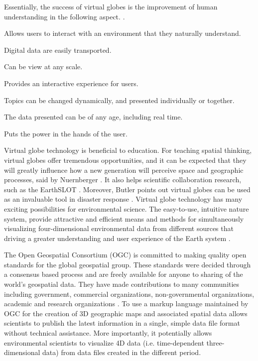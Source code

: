Essentially, the success of virtual globes is the improvement of human understanding in the following aspect. \cite{tuttle.virtual-globes.2008}. 

\begin{description}
\setlength{\parskip}{0pt}
\item[$\bullet$ pseudo-3D] Allows users to interact with an environment that they naturally understand.
\item[$\bullet$ Transportability] Digital data are easily transported.
\item[$\bullet$ Scalability] Can be view at any scale.
\item[$\bullet$ Interactivity] Provides an interactive experience for users.
\item[$\bullet$ Choice of topics] Topics can be changed dynamically, and presented individually or together.
\item[$\bullet$ Currency] The data presented can be of any age, including real time.
\item[$\bullet$ Client-side] Puts the power in the hands of the user.
\end{description}

Virtual globe technology is beneficial to education. For teaching spatial thinking, virtual globes offer tremendous opportunities, and it can be expected that they will greatly influence how a new generation will perceive space and geographic processes, said by Nuernberger \cite{nuernberger.vr-classroom.2006}. It also helps scientific collaboration research, such as the EarthSLOT \cite{earthslot.2016}. Moreover, Butler points out virtual globes can be used as an invaluable tool in disaster response \cite{butler.vg.2006, nourbakhsh.mapping-disaster-zones.2006}. Virtual globe technology has many exciting possibilities for environmental science. The easy-to-use, intuitive nature system, provide attractive and efficient means and methods for simultaneously visualizing four-dimensional environmental data from different sources that driving a greater understanding and user experience of the Earth system \cite{blower.sharing-visualizing.2007}.

The Open Geospatial Consortium (OGC) is committed to making quality open standards for the global geospatial group. These standards were decided through a consensus based process and are freely available for anyone to sharing of the world's geospatial data. They have made contributions to many communities including government, commercial organizations, non-governmental organizations, academic and research organizations \cite{ogc.2016}. To use a markup language maintained by OGC for the creation of 3D geographic maps and associated spatial data allows scientists to publish the latest information in a single, simple data file format without technical assistance. More importantly, it potentially allows environmental scientists to visualize 4D data (i.e. time-dependent three-dimensional data) from data files created in the different period.

